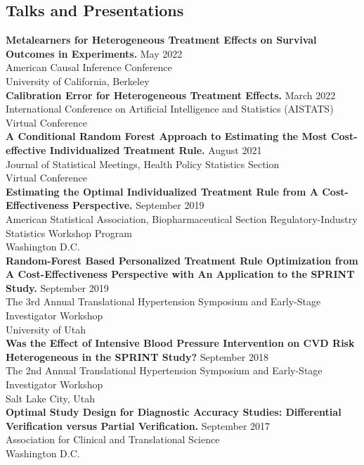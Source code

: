 \documentclass[margin,line]{res}
\begin{document}
\begin{resume}
\section{\sc Talks and Presentations}
\textbf{Metalearners for Heterogeneous Treatment Effects on Survival Outcomes in Experiments.}   \hfill May 2022\\
American Causal Inference Conference\\
University of California, Berkeley\\
\textbf{Calibration Error for Heterogeneous Treatment Effects.} \hfill March 2022\\
International Conference on Artificial Intelligence and Statistics (AISTATS)\\
Virtual Conference\\
\textbf{A Conditional Random Forest Approach to Estimating the Most Cost-effective Individualized Treatment Rule.}  \hfill August 2021\\
Journal of Statistical Meetings, Health Policy Statistics Section \\
Virtual Conference  \\
\textbf{Estimating the Optimal Individualized Treatment Rule from A Cost-Effectiveness Perspective.} \hfill September 2019\\
American Statistical Association, Biopharmaceutical Section Regulatory-Industry Statistics Workshop Program \\
Washington D.C.\\
\textbf{Random-Forest Based Personalized Treatment Rule Optimization from A Cost-Effectiveness Perspective with An Application to the SPRINT Study.} \hfill September 2019 \\
The 3rd Annual Translational Hypertension Symposium and Early-Stage Investigator Workshop\\
University of Utah\\
\textbf{Was the Effect of Intensive Blood Pressure Intervention on CVD Risk Heterogeneous in the SPRINT Study?}  \hfill September 2018\\
The 2nd Annual Translational Hypertension Symposium and Early-Stage Investigator Workshop\\
Salt Lake City, Utah\\
\textbf{Optimal Study Design for Diagnostic Accuracy Studies: Differential Verification versus Partial Verification.} \hfill September 2017\\
Association for Clinical and Translational Science\\
Washington D.C.\\



\end{resume}
\end{document}
